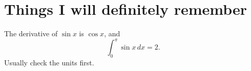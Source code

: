 \documentclass{article}
\begin{document}
\section{Things I will definitely remember}
The derivative of $\sin x$ is $\cos x$, and
\[ \int_0^\pi \sin x \, dx = 2. \]
 Usually check the units first.
\end{document}
